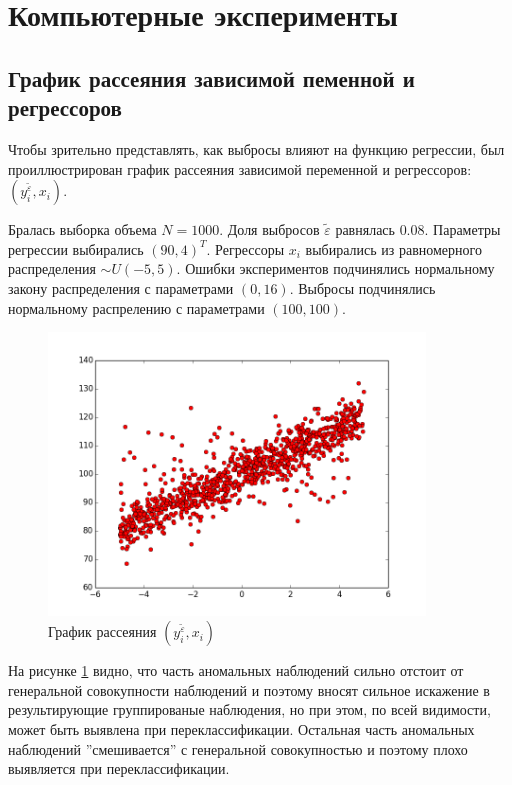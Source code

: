 \section{Компьютерные эксперименты}\label{sec_exp}
\subsection{График рассеяния зависимой пеменной и регрессоров}
Чтобы зрительно представлять, как выбросы влияют на функцию регрессии, был проиллюстрирован график рассеяния зависимой переменной и регрессоров: $(y_i^{\widetilde{\varepsilon}}, x_i)$.

Бралась выборка объема $N = 1000$. Доля выбросов $\widetilde{\varepsilon}$ равнялась $0.08$. 
Параметры регрессии выбирались $(90, 4)^T$. 
Регрессоры $x_i$ выбирались из равномерного распределения $\sim U(-5,5)$. 
Ошибки экспериментов подчинялись нормальному закону распределения с параметрами $(0, 16)$. Выбросы подчинялись нормальному распрелению с параметрами $(100, 100)$. 

\begin{figure}[h!]
    \centering
    \includegraphics[width=100mm]{../images/scatter.png}
    \caption{График рассеяния $(y_i^{\widetilde{\varepsilon}}, x_i)$\label{overflow}}
    \label{pic_scatter}
\end{figure}

На рисунке \ref{pic_scatter} видно, что часть аномальных наблюдений сильно отстоит от генеральной совокупности наблюдений и поэтому вносят сильное искажение в результирующие группированые наблюдения, но при этом, по всей видимости, может быть выявлена при переклассификации.
Остальная часть аномальных наблюдений ''смешивается'' с генеральной совокупностью и поэтому плохо выявляется при переклассификации.

\newpage


